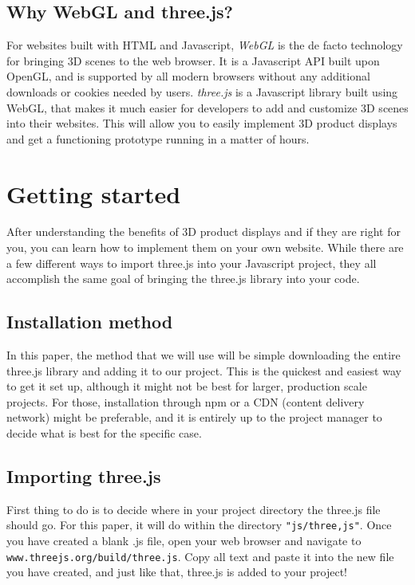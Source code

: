 \documentclass[10pt,final,journal,compsoc]{IEEEtran}
\begin{document}
    \subsection{Why WebGL and three.js?}
    For websites built with HTML and Javascript, \textit{WebGL} is the de facto technology for bringing 3D scenes to the web browser. It is a Javascript API built upon OpenGL, and is supported by all modern browsers without any additional downloads or cookies needed by users. \textit{three.js} is a Javascript library built using WebGL, that makes it much easier for developers to add and customize 3D scenes into their websites. This will allow you to easily implement 3D product displays and get a functioning prototype running in a matter of hours. 



\section{Getting started}
After understanding the benefits of 3D product displays and if they are right for you, you can learn how to implement them on your own website. While there are a few different ways to import three.js into your Javascript project, they all accomplish the same goal of bringing the three.js library into your code.

    \subsection{Installation method} \label{import_methods}
    In this paper, the method that we will use will be simple downloading the entire three.js library and adding it to our project. This is the quickest and easiest way to get it set up, although it might not be best for larger, production scale projects. For those, installation through npm or a CDN (content delivery network) might be preferable, and it is entirely up to the project manager to decide what is best for the specific case.
    
    \subsection{Importing three.js} \label{importing_threejs}
    First thing to do is to decide where in your project directory the three.js file should go. For this paper, it will do within the directory \verb|"js/three,js"|. Once you have created a blank .js file, open your web browser and navigate to \verb|www.threejs.org/build/three.js|. Copy all text and paste it into the new file you have created, and just like that, three.js is added to your project!
\end{document}
